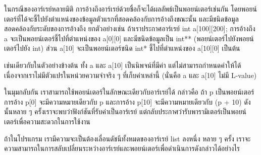 ใน{\wbr}กรณี{\wbr}ของ{\wbr}อาร์เรย์{\wbr}หลาย{\wbr}มิติ การ{\wbr}อ้าง{\wbr}ถึง{\wbr}อาร์เรย์{\wbr}ด้วย{\wbr}ชื่อ{\wbr}ก็{\wbr}จะ{\wbr}ได้{\wbr}ผลลัพธ์{\wbr}เป็น{\wbr}พอยน์เตอร์{\wbr}เช่นกัน{\wbr}
โดย{\wbr}พอยน์เตอร์{\wbr}ที่{\wbr}ได้{\wbr}จะ{\wbr}ชี้{\wbr}ไป{\wbr}ยัง{\wbr}ตำแหน่ง{\wbr}ของ{\wbr}ข้อมูล{\wbr}ตัว{\wbr}แรก{\wbr}ที่{\wbr}สอดคล้อง{\wbr}กับ{\wbr}การ{\wbr}อ้าง{\wbr}ถึง{\wbr}ขณะนั้น{\wbr}
และ{\wbr}มี{\wbr}ชนิด{\wbr}ข้อมูล{\wbr}สอดคล้อง{\wbr}กับ{\wbr}ระดับ{\wbr}ของ{\wbr}การ{\wbr}อ้าง{\wbr}ถึง ยก{\wbr}ตัวอย่าง{\wbr}เช่น ถ้า{\wbr}เรา{\wbr}ประกาศ{\wbr}อาร์เรย์ {\ct
  int a[100][200];} การ{\wbr}อ้าง{\wbr}ถึง {\ct a} จะ{\wbr}เป็น{\wbr}พอยน์เตอร์{\wbr}ชี้{\wbr}ไป{\wbr}ที่{\wbr}ตำแหน่ง{\wbr}ของ {\ct
  a[0][0]} และ{\wbr}มี{\wbr}ชนิด{\wbr}ข้อมูล{\wbr}เป็น {\ct int**} (พอยน์เตอร์ไป{\wbr}ยัง{\wbr}พอยน์เตอร์{\wbr}ไป{\wbr}ยัง {\ct
  int}) ส่วน {\ct a[10]} จะ{\wbr}เป็น{\wbr}พอยน์เตอร์{\wbr}ชนิด {\ct int*} ชี้{\wbr}ไป{\wbr}ที่{\wbr}ตำแหน่ง{\wbr}ของ {\ct
  a[10][0]} เป็นต้น{\wbr}

เช่นเดียวกับ{\wbr}ใน{\wbr}ตัวอย่าง{\wbr}ข้างต้น ทั้ง {\ct a} และ {\ct a[10]} เป็น{\wbr}นิพจน์{\wbr}ที่{\wbr}มี{\wbr}ค่า{\wbr}
แต่{\wbr}ไม่{\wbr}สามารถ{\wbr}กำหนด{\wbr}ค่า{\wbr}ให้{\wbr}ได้ เนื่องจาก{\wbr}เรา{\wbr}ไม่{\wbr}มี{\wbr}ตัวแปร{\wbr}ใน{\wbr}หน่วยความจำ{\wbr}จริง ๆ ที่{\wbr}เก็บ{\wbr}ค่า{\wbr}เหล่านี้{\wbr}
(นั่น{\wbr}คือ {\ct a} และ {\ct a[10]} ไม่{\wbr}มี L-value)

ใน{\wbr}มุมกลับ{\wbr}กัน เรา{\wbr}สามารถ{\wbr}ใช้{\wbr}พอยน์เตอร์{\wbr}ใน{\wbr}ลักษณะ{\wbr}เดียวกับ{\wbr}อาร์เรย์{\wbr}ได้ กล่าวคือ ถ้า {\ct p}
เป็น{\wbr}พอยน์เตอร์ การ{\wbr}อ้าง {\ct p[0]} จะ{\wbr}มี{\wbr}ความหมาย{\wbr}เดียวกับ {\ct *p} และ{\wbr}การ{\wbr}อ้าง{\wbr}
{\ct p[10]} จะ{\wbr}มี{\wbr}ความหมาย{\wbr}เดียวกับ {\ct *(p + 10)} ดังนั้น{\wbr}หลาย ๆ
ครั้ง{\wbr}เรา{\wbr}จะ{\wbr}พบ{\wbr}ว่า{\wbr}ฟังก์ชัน{\wbr}ที่{\wbr}รับ{\wbr}ค่า{\wbr}เป็น{\wbr}อาร์เรย์
แต่{\wbr}กลับ{\wbr}ประกาศ{\wbr}ว่า{\wbr}รับ{\wbr}พารามิเตอร์{\wbr}เป็น{\wbr}พอยน์เตอร์{\wbr}เพื่อ{\wbr}ความ{\wbr}สะดวก{\wbr}ใน{\wbr}การ{\wbr}ใช้{\wbr}งาน{\wbr}

\begin{quiz}{}
ถ้า{\wbr}ใน{\wbr}โปรแกรม เรา{\wbr}มี{\wbr}ความ{\wbr}จะ{\wbr}เป็น{\wbr}ต้อง{\wbr}เลื่อน{\wbr}ดัชนี{\wbr}ทั้งหมด{\wbr}ของ{\wbr}อาร์เรย์ {\ct list} ลง{\wbr}หนึ่ง{\wbr}
หลาย ๆ ครั้ง{\wbr}
เรา{\wbr}จะ{\wbr}ความ{\wbr}สามารถ{\wbr}ใน{\wbr}การ{\wbr}สลับ{\wbr}เปลี่ยน{\wbr}ระหว่าง{\wbr}อาร์เรย์{\wbr}และ{\wbr}พอยน์เตอร์{\wbr}เพื่อ{\wbr}ดำเนินการ{\wbr}ดังกล่าว{\wbr}ได้{\wbr}อย่างไร{\wbr}
\end{quiz}

